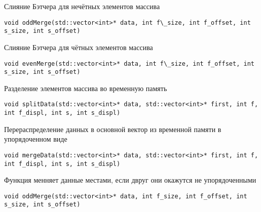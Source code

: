 \documentclass{report}
\begin{document}
\par Слияние Бэтчера для нечётных элементов массива \par
\begin{lstlisting}
void oddMerge(std::vector<int>* data, int f\_size, int f_offset, int s_size, int s_offset)
\end{lstlisting}
\par Слияние Бэтчера для чётных элементов массива \par
\begin{lstlisting}
void evenMerge(std::vector<int>* data, int f\_size, int f_offset, int s_size, int s_offset)
\end{lstlisting}
\par Разделение элементов массива во временную память \par
\begin{lstlisting}
void splitData(std::vector<int>* data, std::vector<int>* first, int f, int f_displ, int s, int s_displ)
\end{lstlisting}
\par Перераспределение данных в основной вектор из временной памяти в упорядоченном виде \par
\begin{lstlisting}
void mergeData(std::vector<int>* data, std::vector<int>* first, int f, int f_displ, int s, int s_displ)
\end{lstlisting}
\par Функция менняет данные местами, если двруг они окажутся не упорядоченными \par
\begin{lstlisting}
void oddMerge(std::vector<int>* data, int f_size, int f_offset, int s_size, int s_offset)
\end{lstlisting}
\end{document}

